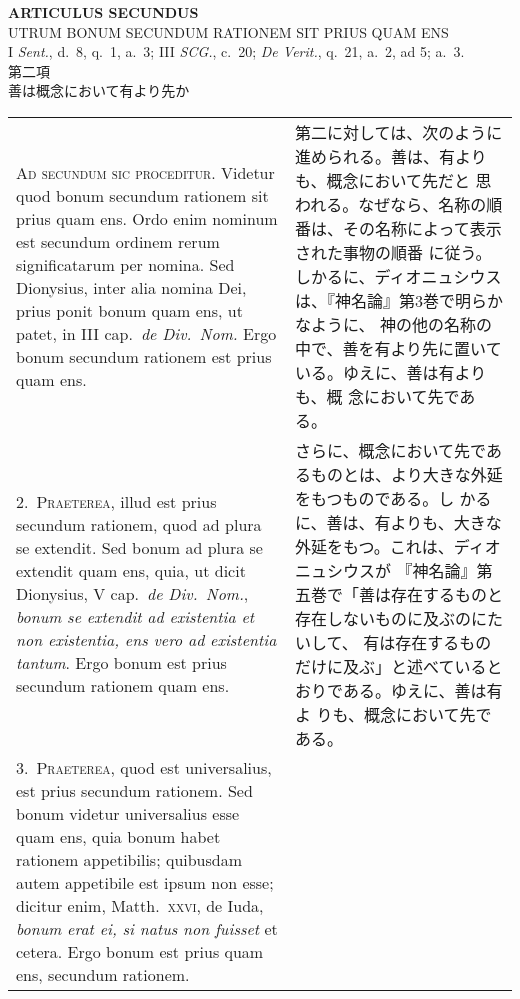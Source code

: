 \documentclass[10pt]{jsarticle}
\begin{document}
\newpage
{}

\begin{center}
 {\Large {\bf ARTICULUS SECUNDUS}}\\
 {\large UTRUM BONUM SECUNDUM RATIONEM SIT PRIUS QUAM ENS}\\
 {\footnotesize I {\itshape Sent.}, d.~8, q.~1, a.~3; III {\itshape
 SCG.}, c.~20; {\itshape De Verit.}, q.~21, a.~2, ad 5; a.~3.}\\
 {\Large 第二項\\善は概念において有より先か}
\end{center}

\begin{longtable}{p{21em}p{21em}}


{\huge A}{\scshape d secundum sic proceditur}. Videtur quod bonum
 secundum rationem sit prius quam ens. Ordo enim nominum est secundum
 ordinem rerum significatarum per nomina. Sed Dionysius, inter alia
 nomina Dei, prius ponit bonum quam ens, ut patet, in III cap.~{\itshape de
 Div.~Nom.} Ergo bonum secundum rationem est prius quam ens.

&
第二に対しては、次のように進められる。善は、有よりも、概念において先だと
 思われる。なぜなら、名称の順番は、その名称によって表示された事物の順番
 に従う。しかるに、ディオニュシウスは、『神名論』第3巻で明らかなように、
 神の他の名称の中で、善を有より先に置いている。ゆえに、善は有よりも、概
 念において先である。

\\



2.~{\scshape Praeterea}, illud est prius secundum rationem, quod ad
 plura se extendit. Sed bonum ad plura se extendit quam ens, quia, ut
 dicit Dionysius, V cap.~{\itshape de Div.~Nom.}, {\itshape bonum se
 extendit ad existentia et non existentia, ens vero ad existentia
 tantum}. Ergo bonum est prius secundum rationem quam ens.

&

さらに、概念において先であるものとは、より大きな外延をもつものである。し
 かるに、善は、有よりも、大きな外延をもつ。これは、ディオニュシウスが
 『神名論』第五巻で「善は存在するものと存在しないものに及ぶのにたいして、
 有は存在するものだけに及ぶ」と述べているとおりである。ゆえに、善は有よ
 りも、概念において先である。

\\


3.~{\scshape Praeterea}, quod est universalius, est prius secundum
 rationem. Sed bonum videtur universalius esse quam ens, quia bonum
 habet rationem appetibilis; quibusdam autem appetibile est ipsum non
 esse; dicitur enim, Matth.~{\scshape xxvi}, de Iuda, {\itshape bonum
 erat ei, si natus non fuisset} et cetera. Ergo bonum est prius quam
 ens, secundum rationem.


\end{longtable}
\end{document}
